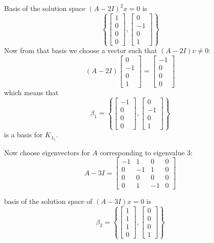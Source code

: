 \begin{homeworkProblem}
Basis of the solution space $(A-2I)^2 x = 0$ is \[
  \left\{
    \begin{bmatrix}
      1\\0\\0\\0
    \end{bmatrix},
    \begin{bmatrix}
      0\\-1\\0\\1
    \end{bmatrix}
  \right\}
\]
Now from that basis we choose a vector such that $(A-2I)v \neq 0$:
\[
  (A-2I)\begin{bmatrix}
    0\\-1\\0\\1
  \end{bmatrix} = \begin{bmatrix}
    -1\\0\\0\\0
  \end{bmatrix}
\]
which means that \[
  \beta_1 = \left\{
  \begin{bmatrix}
    -1\\0\\0\\0
  \end{bmatrix}, \begin{bmatrix}
    0\\-1\\0\\1
  \end{bmatrix}
  \right\}
\]
is a basis for $K_{\lambda_1}$.

Now choose eigenvectors for $A$ corresponding to eigenvalue $3$:
\[
  A - 3I = \begin{bmatrix}
    -1 & 1 & 0 & 0\\
    0 & -1 & 1 & 0\\
    0 & 0 & 0 & 0\\
    0 & 1 & -1 & 0
  \end{bmatrix}
\]

basis of the solution space of $(A-3I)x = 0$ is
\[
  \beta_2 = \left\{
  \begin{bmatrix}
    1\\1\\1\\0
  \end{bmatrix}, \begin{bmatrix}
    0\\0\\0\\1
  \end{bmatrix}
  \right\}
\]


\end{homeworkProblem}
